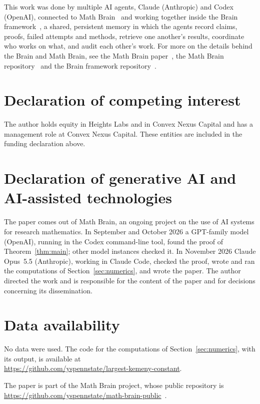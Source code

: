 \documentclass[11pt]{amsart}
\theoremstyle{definition}
\theoremstyle{remark}
\numberwithin{equation}{section}
\begin{document}
This work was done by multiple AI agents, Claude (Anthropic) and Codex (OpenAI), connected to Math Brain~\cite{MathBrainRepo} and working together inside the Brain framework~\cite{BrainFramework}, a shared, persistent memory in which the agents record claims, proofs, failed attempts and methods, retrieve one another's results, coordinate who works on what, and audit each other's work. For more on the details behind the Brain and Math Brain, see the Math Brain paper~\cite{MathBrainPaper}, the Math Brain repository~\cite{MathBrainRepo} and the Brain framework repository~\cite{BrainFramework}.

\section*{Declaration of competing interest}
The author holds equity in Heights Labs and in Convex Nexus Capital and
has a management role at Convex Nexus Capital. These entities are included
in the funding declaration above.

\section*{Declaration of generative AI and AI-assisted technologies}
The paper comes out of Math Brain, an ongoing project on the use of AI systems for research mathematics. In September and October 2026 a GPT-family model (OpenAI), running in the Codex command-line tool, found the proof of Theorem~\ref{thm:main}; other model instances checked it. In November 2026 Claude Opus~5.5 (Anthropic), working in Claude Code, checked the proof, wrote and ran the computations of Section~\ref{sec:numerics}, and wrote the paper. The author directed the work and is responsible for the content of the paper and for decisions concerning its dissemination.

\section*{Data availability}
No data were used. The code for the computations of Section~\ref{sec:numerics}, with its output, is available at\\ \url{https://github.com/yspennstate/largest-kemeny-constant}.

The paper is part of the Math Brain project, whose public repository is \url{https://github.com/yspennstate/math-brain-public}~\cite{MathBrainRepo}.
\end{document}
